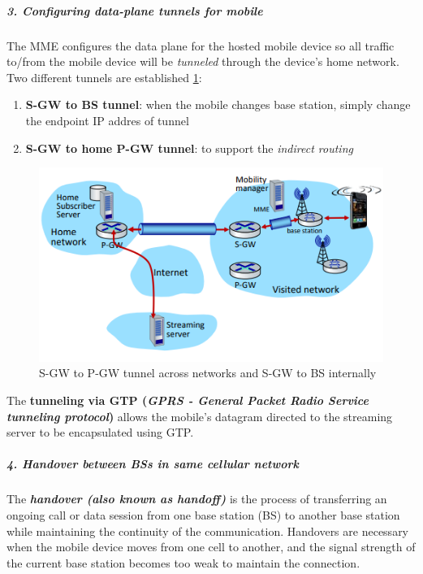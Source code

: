\documentclass[10pt,a4paper]{report}
\theoremstyle{definition}
\begin{document}
\subparagraph{3. Configuring data-plane tunnels for mobile}
The MME configures the data plane for the hosted mobile device so all traffic to/from the mobile device will be \textit{tunneled} through the device's home network. 
Two different tunnels are established \ref{double-tunneling}:
\begin{enumerate}
	
	\item \textbf{S-GW to BS tunnel}: when the mobile changes base station, simply change the endpoint IP addres of tunnel
	\item \textbf{S-GW to home P-GW tunnel}: to support the \textit{indirect routing}
\end{enumerate}
 
\begin{figure}[h]
	\centering\includegraphics[scale=0.50]{images/Pasted image 20230322120711.png}
	\caption{S-GW to P-GW tunnel across networks and S-GW to BS internally}
	\label{double-tunneling}
\end{figure}

The \textbf{tunneling via GTP (\textit{GPRS - General Packet Radio Service tunneling protocol})} allows the mobile's datagram directed to the streaming server to be encapsulated using GTP.

\subparagraph{4. Handover between BSs in same cellular network}
The \textit{\textbf{handover (also known as handoff)}} is the process of transferring an ongoing call or data session from one base station (BS) to another base station while maintaining the continuity of the communication. Handovers are necessary when the mobile device moves from one cell to another, and the signal strength of the current base station becomes too weak to maintain the connection.
\end{document}
